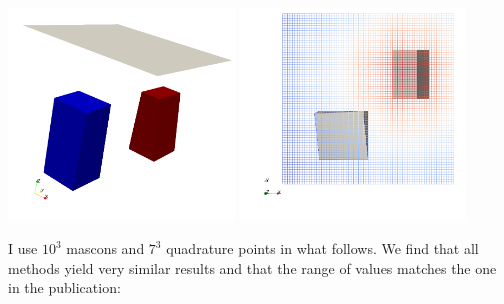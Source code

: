\begin{center}
\includegraphics[width=6cm]{python_codes/fieldstone_113/images/blocks_1}
\includegraphics[width=6cm]{python_codes/fieldstone_113/images/blocks_2}
\end{center}

I use $10^3$ mascons and $7^3$ quadrature points in what follows.
We find that all methods yield very similar results and that the range
of values matches the one in the publication: 

